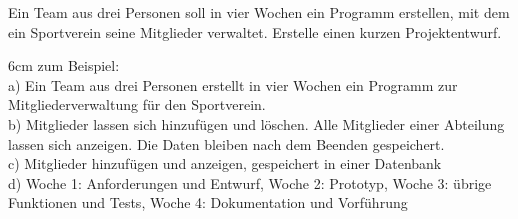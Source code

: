 \question[6]
Ein Team aus drei Personen soll in vier Wochen ein Programm erstellen, mit dem ein Sportverein seine Mitglieder verwaltet. Erstelle einen kurzen Projektentwurf.
\begin{solutionbox}{6cm}
zum Beispiel: \\
a) Ein Team aus drei Personen erstellt in vier Wochen ein Programm zur Mitgliederverwaltung für den Sportverein. \\
b) Mitglieder lassen sich hinzufügen und löschen. Alle Mitglieder einer Abteilung lassen sich anzeigen. Die Daten bleiben nach dem Beenden gespeichert. \\
c) Mitglieder hinzufügen und anzeigen, gespeichert in einer Datenbank \\
d) Woche 1: Anforderungen und Entwurf, Woche 2: Prototyp, Woche 3: übrige Funktionen und Tests, Woche 4: Dokumentation und Vorführung
\end{solutionbox}
